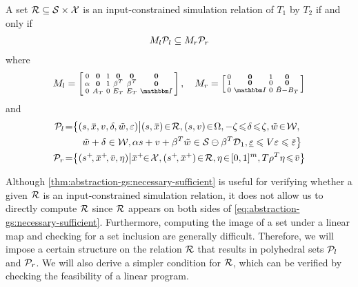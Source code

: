 \begin{theorem}
  \label{thm:abstraction-gs:necessary-sufficient}
  A set $\mathcal{R} \subseteq \mathcal{S} \times \mathcal{X}$ is an input-constrained simulation relation of $T_{1}$ by $T_{2}$ %
if and only if
  \begin{align}
    \label{eq:abstraction-gs:necessary-sufficient}
    M_l \mathcal{P}_l \subseteq M_r \mathcal{P}_r
  \end{align}
  where 
  \begin{gather*}
  M_l = \left[
  \begin{smallmatrix}
    0 & \Zero & 1 & \Zero & \Zero & \Zero \\
    \alpha & \Zero & 1 & \beta^{T} & \beta^{T} & \Zero \\
    0 & A_T & 0 & E_T & E_T & \IdentityMatrix
  \end{smallmatrix} \right], \quad
    M_r =
    \left[\begin{smallmatrix}
        0 & \Zero & 1 & \Zero \\
        1 & \Zero & 0 & \Zero \\
        0 & \IdentityMatrix & 0 & \tilde{B} - B_{T}
      \end{smallmatrix}\right]
  \end{gather*}
  and
  \begin{align*}
    \PSet_l \!=& \big\{ (s,\overbar{x}, v, \delta, \tilde{w}, \varepsilon) \big|
    (s,\overbar{x}) \!\in\! \RSet, (s,v) \!\in\! \Omega, -\zeta \!\leqslant\! \delta \!\leqslant\! \zeta, \tilde{w} \!\in\! \WSet,\big.\\
    &\quad \big. \tilde{w} + \delta \in \WSet, \alpha s + v + \beta^{T} \tilde{w} \in \SSet \ominus \beta^{T} \mathcal{D}_{1}, \underline{\varepsilon} \leqslant V \varepsilon \leqslant \overbar{\varepsilon} \big\} \\
    \PSet_r \!=& \big\{(s^+\!, \overbar{x}^{+}\!, \overbar{v}, \eta) \big|
               \overbar{x}^{+} \!\!\in\! \XSet, (s^{+}\!, \overbar{x}^{+}) \!\in\! \RSet, \eta \!\in\! [0,1]^{m},
                 T \rho^{T} \eta \!\leqslant\! \overbar{v}\big\}
  \end{align*}
\end{theorem}

Although \cref{thm:abstraction-gs:necessary-sufficient} is useful for verifying whether a given $\mathcal{R}$ is an input-constrained simulation relation, it does not allow us to directly compute $\mathcal{R}$ since $\mathcal{R}$ appears on both sides of \eqref{eq:abstraction-gs:necessary-sufficient}.
Furthermore, computing the image of a set under a linear map and checking for a set inclusion are generally difficult.
Therefore, we will impose a certain structure on the relation $\mathcal{R}$ that results in polyhedral sets $\mathcal{P}_{l}$ and $\mathcal{P}_{r}$.
We will also derive a simpler condition for $\mathcal{R}$, which can be verified by checking the feasibility of a linear program.

